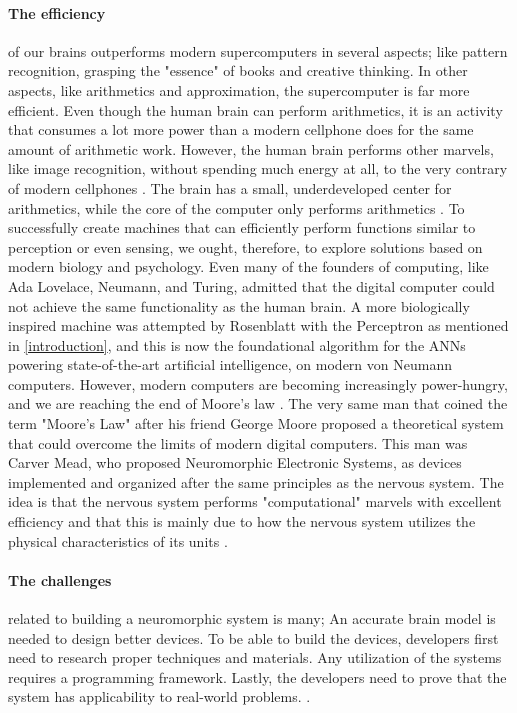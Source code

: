 \paragraph{The efficiency} of our brains outperforms modern supercomputers in several aspects; like pattern recognition, grasping the "essence" of books and creative thinking.
In other aspects, like arithmetics and approximation, the supercomputer is far more efficient.
Even though the human brain can perform arithmetics, it is an activity that consumes a lot more power than a modern cellphone does for the same amount of arithmetic work. However, the human brain performs other marvels, like image recognition, without spending much energy at all, to the very contrary of modern cellphones \cite{meier_special_2017}. The brain has a small, underdeveloped center for arithmetics, while the core of the computer only performs arithmetics \cite{dehaene_arithmetic_2004}.
To successfully create machines that can efficiently perform functions similar to perception or even sensing, we ought, therefore, to explore solutions based on modern biology and psychology.
Even many of the founders of computing, like Ada Lovelace, Neumann, and Turing, admitted that the digital computer could not achieve the same functionality as the human brain.
A more biologically inspired machine was attempted by Rosenblatt with the Perceptron as mentioned in \vref{introduction}, and this is now the foundational algorithm for the ANNs powering state-of-the-art artificial intelligence, on modern von Neumann computers.
However, modern computers are becoming increasingly power-hungry, and we are reaching the end of Moore's law \cite{mead_neuromorphic_1990} \cite{moore_cramming_1998}.
The very same man that coined the term "Moore's Law" after his friend George Moore proposed a theoretical system that could overcome the limits of modern digital computers.
This man was Carver Mead, who proposed Neuromorphic Electronic Systems, as devices implemented and organized after the same principles as the nervous system.
The idea is that the nervous system performs "computational" marvels with excellent efficiency and that this is mainly due to how the nervous system utilizes the physical characteristics of its units \cite{mead_neuromorphic_1990}.

\paragraph{The challenges} related to building a neuromorphic system is many;
An accurate brain model is needed to design better devices.
To be able to build the devices, developers first need to research proper techniques and materials.
Any utilization of the systems requires a programming framework.
Lastly, the developers need to prove that the system has applicability to real-world problems.
\cite{schuman_survey_2017}.

